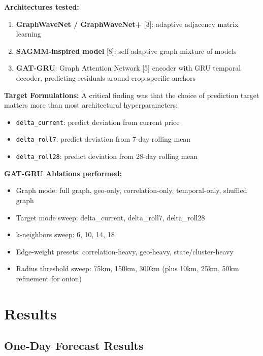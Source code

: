\documentclass[conference]{IEEEtran}
\begin{document}
\textbf{Architectures tested:}

\begin{enumerate}
\item \textbf{GraphWaveNet / GraphWaveNet+} [3]: adaptive adjacency matrix learning
\item \textbf{SAGMM-inspired model} [8]: self-adaptive graph mixture of models
\item \textbf{GAT-GRU}: Graph Attention Network [5] encoder with GRU temporal decoder, predicting residuals around crop-specific anchors
\end{enumerate}

\textbf{Target Formulations:} A critical finding was that the choice of prediction target matters more than most architectural hyperparameters:

\begin{itemize}
\item \texttt{delta\_current}: predict deviation from current price
\item \texttt{delta\_roll7}: predict deviation from 7-day rolling mean
\item \texttt{delta\_roll28}: predict deviation from 28-day rolling mean
\end{itemize}

\textbf{GAT-GRU Ablations performed:}

\begin{itemize}
\item Graph mode: full graph, geo-only, correlation-only, temporal-only, shuffled graph
\item Target mode sweep: delta\_current, delta\_roll7, delta\_roll28
\item k-neighbors sweep: 6, 10, 14, 18
\item Edge-weight presets: correlation-heavy, geo-heavy, state/cluster-heavy
\item Radius threshold sweep: 75km, 150km, 300km (plus 10km, 25km, 50km refinement for onion)
\end{itemize}

\section{Results}

\subsection{One-Day Forecast Results}
\end{document}
